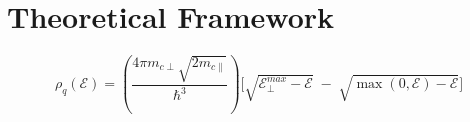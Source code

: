 \newpage
\section{Theoretical Framework}
\label{sec:theoretical_framework}

\begin{equation}
\boxed{ \rho_q(\mathcal{E}) = \left( \frac{4\pi m_{c\perp} \sqrt{2m_{c\parallel}}}{\hbar^3} \right) \Bigg[ \sqrt{\mathcal{E}_{\perp}^{max} - \mathcal{E}} \; - \; \sqrt{\max(0, \mathcal{E}) - \mathcal{E}} \Bigg] }
\label{eq:theoretical_framework_rho_q}
\end{equation}
